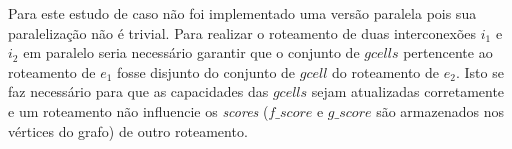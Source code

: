 Para este estudo de caso não foi implementado uma versão paralela pois sua paralelização não é trivial.
Para realizar o roteamento de duas interconexões $i_1$ e $i_2$ em paralelo seria necessário garantir que o conjunto de $gcells$ pertencente ao roteamento de $e_1$ fosse disjunto do conjunto de $gcell$ do roteamento de $e_2$.
Isto se faz necessário para que as capacidades das $gcells$ sejam atualizadas corretamente e um roteamento não influencie os \textit{scores} ($f\_score$ e $g\_score$ são armazenados nos vértices do grafo) de outro roteamento.